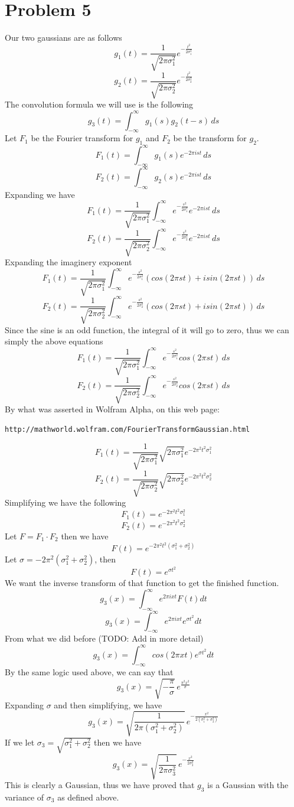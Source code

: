 \documentclass[11pt,psfig]{article}
\begin{document}
\section*{Problem 5}

Our two gaussians are as follows
\[
g_1(t) = \frac{1}{\sqrt{2\pi \sigma_1^2}} e^{-\frac{t^2}{2\sigma_1^2}}
\]
\[
g_2(t) = \frac{1}{\sqrt{2\pi \sigma_2^2}} e^{-\frac{t^2}{2\sigma_2^2}}
\]
The convolution formula we will use is the following
\[
g_3(t) = \int_{-\infty}^{\infty}{g_1(s)g_2(t-s) \, ds}
\]
Let $F_1$ be the Fourier transform for $g_1$ and $F_2$ be the transform for $g_2$.\\
\[
F_1(t) = \int_{-\infty}^{\infty}{g_1(s) e^{-2\pi i s t} \, ds}
\]
\[
F_2(t) = \int_{-\infty}^{\infty}{g_2(s) e^{-2\pi i s t} \, ds}
\]
Expanding we have
\[
F_1(t) = \frac{1}{\sqrt{2 \pi \sigma_1^2}} \int_{-\infty}^{\infty}{e^{-\frac{s^2}{2\sigma_1^2}} e^{-2\pi i s t} \, ds}
\]
\[
F_2(t) = \frac{1}{\sqrt{2 \pi \sigma_2^2}} \int_{-\infty}^{\infty}{e^{-\frac{s^2}{2\sigma_2^2}} e^{-2\pi i s t} \, ds}
\]
Expanding the imaginery exponent
\[
F_1(t) = \frac{1}{\sqrt{2 \pi \sigma_1^2}} \int_{-\infty}^{\infty}{e^{-\frac{s^2}{2\sigma_1^2}} (cos(2\pi s t) + i sin(2\pi s t)) \, ds}
\]
\[
F_2(t) = \frac{1}{\sqrt{2 \pi \sigma_2^2}} \int_{-\infty}^{\infty}{e^{-\frac{s^2}{2\sigma_2^2}} (cos(2\pi s t) + i sin(2\pi s t)) \, ds}
\]
Since the sine is an odd function, the integral of it will go to zero, thus we can simply the above equations
\[
F_1(t) = \frac{1}{\sqrt{2 \pi \sigma_1^2}} \int_{-\infty}^{\infty}{e^{-\frac{s^2}{2\sigma_1^2}} cos(2\pi s t) \, ds}
\]
\[
F_2(t) = \frac{1}{\sqrt{2 \pi \sigma_2^2}} \int_{-\infty}^{\infty}{e^{-\frac{s^2}{2\sigma_2^2}} cos(2\pi s t) \, ds}
\]
By what was asserted in Wolfram Alpha, on this web page:
\begin{verbatim}
http://mathworld.wolfram.com/FourierTransformGaussian.html
\end{verbatim}
\[
F_1(t) = \frac{1}{\sqrt{2 \pi \sigma_1^2}} \sqrt{2 \pi \sigma_1^2} e^{-2 \pi^2 t^2 \sigma_1^2}
\]
\[
F_2(t) = \frac{1}{\sqrt{2 \pi \sigma_2^2}} \sqrt{2 \pi \sigma_2^2} e^{-2 \pi^2 t^2 \sigma_2^2}
\]
Simplifying we have the following
\[
F_1(t) = e^{-2 \pi^2 t^2 \sigma_1^2}
\]
\[
F_2(t) = e^{-2 \pi^2 t^2 \sigma_2^2}
\]
Let $F=F_1 \cdot F_2$ then we have
\[
F(t) = e^{-2 \pi^2 t^2 (\sigma_1^2 + \sigma_2^2)}
\]
Let $\sigma = -2 \pi^2 (\sigma_1^2 + \sigma_2^2)$, then 
\[
F(t) = e^{\sigma t^2}
\]
We want the inverse transform of that function to get the finished function. 
\[
g_3(x) = \int_{-\infty}^{\infty} e^{2\pi i x t} F(t) dt
\]
\[
g_3(x) = \int_{-\infty}^{\infty} e^{2\pi i x t}e^{\sigma t^2} dt
\]
From what we did before (TODO: Add in more detail)
\[
g_3(x) = \int_{-\infty}^{\infty} cos(2 \pi x t)e^{\sigma t^2} dt
\]
By the same logic used above, we can say that
\[
g_3(x) = \sqrt{-\frac{\pi}{\sigma}} \, e^{\frac{\pi^2 x^2}{\sigma}}
\]
Expanding $\sigma$ and then simplifying, we have
\[
g_3(x) = \sqrt{\frac{1}{2\pi (\sigma_1^2 + \sigma_2^2)}} \, e^{-\frac{x^2}{2(\sigma_1^2 + \sigma_2^2)}}
\]
If we let $\sigma_3 = \sqrt{\sigma_1^2 + \sigma_2^2}$ then we have
\[
g_3(x) = \sqrt{\frac{1}{2\pi \sigma_3^2}} \, e^{-\frac{x^2}{2\sigma_3^2}}
\]
This is clearly a Gaussian, thus we have proved that $g_3$ is a Gaussian with the variance of $\sigma_3$ as defined above. 
\end{document}
